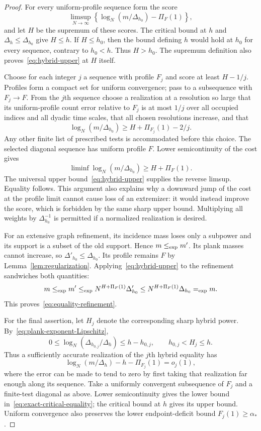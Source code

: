 \begin{proof}
For every uniform-profile sequence form the score
\[
 \limsup_{N\to\infty}
 \left\{\log_N(m/\Delta_{h_0})-\Pi_F(1)\right\},
\]
and let $H$ be the supremum of these scores.  The critical bound at $h$
and $\Delta_h\le\Delta_{h_0}$ give $H\le h$.
If $H\le h_0$, then the bound defining $h$ would hold at $h_0$ for every
sequence, contrary to $h_0<h$.  Thus $H>h_0$.  The supremum definition also
proves~\eqref{eq:hybrid-upper} at $H$ itself.

Choose for each integer $j$ a sequence with profile $F_j$ and score at least
$H-1/j$.  Profiles form a compact set for uniform convergence; pass to a
subsequence with $F_j\to F$.  From the $j$th sequence choose a realization
at a resolution so large that its uniform-profile count error relative to
$F_j$ is at most $1/j$ over all occupied indices and all dyadic time scales,
that all chosen resolutions increase, and that
\[
 \log_N(m/\Delta_{h_0})\ge H+\Pi_{F_j}(1)-2/j.
\]
Any other finite list of prescribed tests is accommodated before this
choice.  The selected diagonal sequence has uniform profile $F$.
Lower semicontinuity of the cost gives
\[
 \liminf\log_N(m/\Delta_{h_0})\ge H+\Pi_F(1).
\]
The universal upper bound~\eqref{eq:hybrid-upper} supplies the reverse
limsup.  Equality follows.  This argument also explains why a downward
jump of the cost at the profile limit cannot cause loss of an extremizer:
it would instead improve the score, which is forbidden by the same sharp
upper bound.  Multiplying all weights by $\Delta_{h_0}^{-1}$ is permitted
if a normalized realization is desired.

For an extensive graph refinement, its incidence mass loses only a
subpower and its support is a subset of the old support.  Hence
$m\mathrel{\leq_{\mathrm{exp}}} m'$.  Its plank masses cannot increase, so
$\Delta'_{h_0}\le\Delta_{h_0}$.  Its profile remains $F$ by
Lemma~\ref{lem:regularization}.  Applying~\eqref{eq:hybrid-upper} to the
refinement sandwiches both quantities:
\[
 m\mathrel{\leq_{\mathrm{exp}}} m'\mathrel{\leq_{\mathrm{exp}}}
 N^{H+\Pi_F(1)}\Delta'_{h_0}
 \le N^{H+\Pi_F(1)}\Delta_{h_0}\mathrel{=_{\mathrm{exp}}} m.
\]
This proves~\eqref{eq:equality-refinement}.

For the final assertion, let $H_j$ denote the corresponding sharp hybrid
power.  By~\eqref{eq:plank-exponent-Lipschitz},
\[
 0\le\log_N(\Delta_{h_{0,j}}/\Delta_h)\le h-h_{0,j},
 \qquad h_{0,j}<H_j\le h.
\]
Thus a sufficiently accurate realization of the $j$th hybrid equality has
\[
 \log_N(m/\Delta_h)-h-\Pi_{F_j}(1)
 =o_j(1),
\]
where the error can be made to tend to zero by first taking that
realization far enough along its sequence.  Take a uniformly convergent
subsequence of $F_j$ and a finite-test diagonal as above.  Lower
semicontinuity gives the lower bound in~\eqref{eq:exact-critical-equality};
the critical bound at $h$ gives its upper bound.  Uniform convergence also
preserves the lower endpoint-deficit bound $F_j(1)\ge\alpha_*$.
\end{proof}

